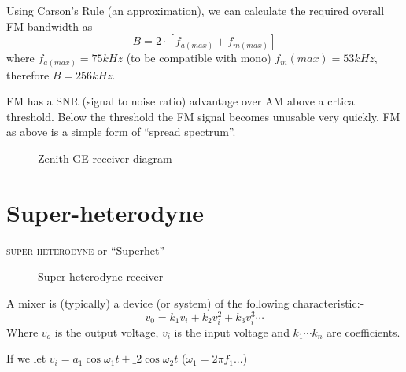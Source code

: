 \documentclass[11pt]{article} %
\begin{document}
		Using Carson's Rule (an approximation), we can calculate the required overall FM bandwidth as
		\begin{equation}
			B = 2 \cdot \left[f_{a(max)}+f_{m(max)}\right]
		\end{equation}
		where $f_{a(max)} = 75kHz$ (to be compatible with mono) $f_m(max) = 53kHz$, therefore $B=256kHz$.

		FM has a SNR (signal to noise ratio) advantage over AM above a crtical threshold. Below the threshold the FM signal becomes unusable very quickly. FM as above is a simple form of ``spread spectrum''.
		\begin{figure}[h]
			\centering
			\begin{tikzpicture}
			\end{tikzpicture}
			\label{fig:zenithreciever}
			\caption{Zenith-GE receiver diagram}
		\end{figure}

\section{Super-heterodyne}
	\textsc{super-heterodyne} or ``Superhet''

	\begin{figure}[h]
		\centering
		\begin{tikzpicture}
		\end{tikzpicture}
		\label{fig:superhetrec}
		\caption{Super-heterodyne receiver}
	\end{figure}

	A mixer is (typically) a device (or system) of the following characteristic:-
		\begin{equation}
			v_0 = k_1v_i+k_2v_i^2+k_3v_i^3 \cdots
		\end{equation}
		Where $v_o$ is the output voltage, $v_i$ is the input voltage and $k_1 \cdots k_n$ are coefficients.

	If we let $v_i=a_1 \cos{\omega_1t} + \_2 \cos{\omega_2t} \label{eq:het}$ ($\omega_1=2\pi f_1$...)
\end{document}
